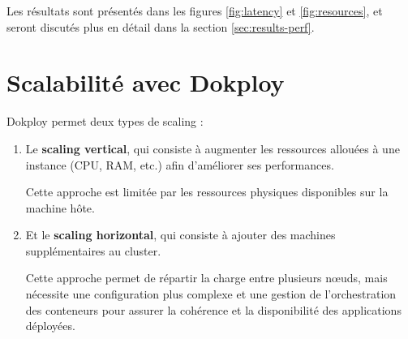 \documentclass{rapportClass} %
\begin{document}
\smallskip
Les résultats sont présentés dans les figures \ref{fig:latency} et \ref{fig:resources}, et seront discutés plus en 
détail dans la section \ref{sec:results-perf}.







\section{Scalabilité avec Dokploy}
Dokploy permet deux types de scaling : 
\begin{enumerate}
\item Le \textbf{scaling vertical}, qui consiste à augmenter les
  ressources allouées à une instance (CPU, RAM, etc.)  afin
  d'améliorer ses performances.

  Cette approche est limitée par les ressources physiques disponibles
  sur la machine hôte.

\item Et le \textbf{scaling horizontal}, qui consiste à ajouter des
  machines supplémentaires au cluster.

  Cette approche permet de répartir la charge entre plusieurs nœuds,
  mais nécessite une configuration plus complexe et une gestion de
  l'orchestration des conteneurs pour assurer la cohérence et la
  disponibilité des applications déployées.
\end{enumerate}


\end{document}
